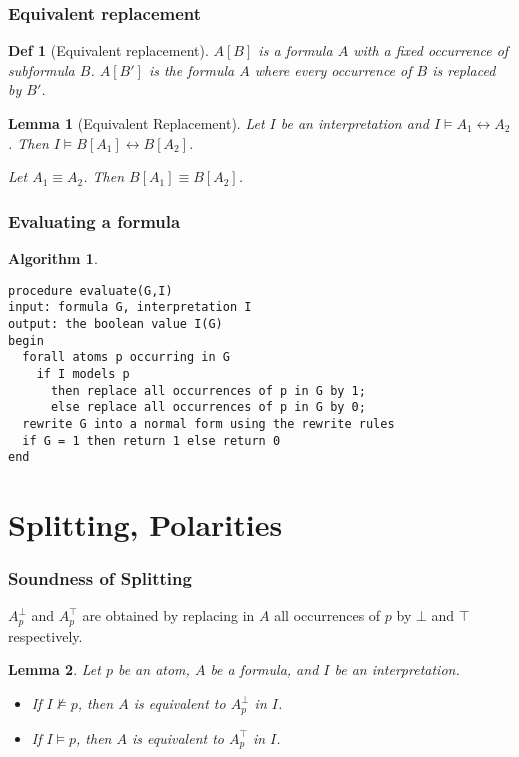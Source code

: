 \documentclass[]{article}
\newtheorem{lemma}{Lemma}
\newtheorem*{definition*}{Def}
\newtheorem{algorithm}{Algorithm}
\begin{document}
\subsubsection{Equivalent replacement}
\begin{definition*}[Equivalent replacement]
	$A[B]$ is a formula $A$ with a fixed occurrence of subformula $B$. $A[B']$ is the formula $A$ where every occurrence of $B$ is replaced by $B'$.
\end{definition*}

\begin{lemma}[Equivalent Replacement]
	Let $I$ be an interpretation and $I \models A_1 \leftrightarrow A_2$. Then $I \models B[A_1] \leftrightarrow B[A_2]$.
	
	Let $A_1 \equiv A_2$. Then $B[A_1] \equiv B[A_2]$.
\end{lemma}


\subsubsection{Evaluating a formula}
\begin{algorithm}
\begin{verbatim}
procedure evaluate(G,I)
input: formula G, interpretation I
output: the boolean value I(G)
begin
  forall atoms p occurring in G
    if I models p
      then replace all occurrences of p in G by 1;
      else replace all occurrences of p in G by 0;
  rewrite G into a normal form using the rewrite rules
  if G = 1 then return 1 else return 0
end
\end{verbatim}
\end{algorithm}

\section{Splitting, Polarities}

\subsubsection{Soundness of Splitting}

$A_p^\bot$ and $A_p^\top$ are obtained by replacing in $A$ all occurrences of $p$ by $\bot$ and $\top$ respectively.

\begin{lemma}
	Let $p$ be an atom, $A$ be a formula, and $I$ be an interpretation.
	
	\begin{itemize}
		\item If $I \not\models p$, then $A$ is equivalent to $A_p^\bot$ in $I$.
		\item If $I \models p$, then $A$ is equivalent to $A_p^\top$ in $I$.
	\end{itemize}
\end{lemma}
\end{document}
